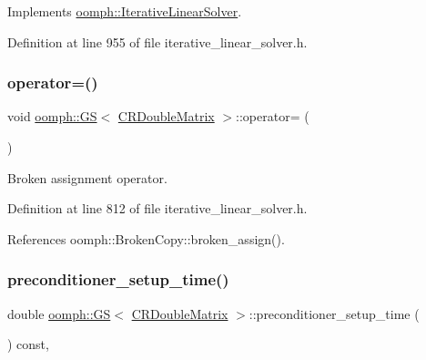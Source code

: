 Implements \hyperlink{classoomph_1_1IterativeLinearSolver_a5fe7f7b5e4847fdbd4f95d3875ec7a46}{oomph\+::\+Iterative\+Linear\+Solver}.



Definition at line 955 of file iterative\+\_\+linear\+\_\+solver.\+h.

\mbox{\label{classoomph_1_1GS_3_01CRDoubleMatrix_01_4_aa26bdc7f0230aeb37d17f4fd99dbf5c9}} 
\subsubsection{\texorpdfstring{operator=()}{operator=()}}
{\footnotesize\ttfamily void \hyperlink{classoomph_1_1GS}{oomph\+::\+GS}$<$ \hyperlink{classoomph_1_1CRDoubleMatrix}{C\+R\+Double\+Matrix} $>$\+::operator= (\begin{DoxyParamCaption}\item[{const \hyperlink{classoomph_1_1GS}{GS}$<$ \hyperlink{classoomph_1_1CRDoubleMatrix}{C\+R\+Double\+Matrix} $>$ \&}]{ }\end{DoxyParamCaption})\hspace{0.3cm}{\ttfamily [inline]}}



Broken assignment operator. 



Definition at line 812 of file iterative\+\_\+linear\+\_\+solver.\+h.



References oomph\+::\+Broken\+Copy\+::broken\+\_\+assign().

\mbox{\label{classoomph_1_1GS_3_01CRDoubleMatrix_01_4_af3ddbbec56c0ecc849b07bcec0c19bf4}} 
\subsubsection{\texorpdfstring{preconditioner\+\_\+setup\+\_\+time()}{preconditioner\_setup\_time()}}
{\footnotesize\ttfamily double \hyperlink{classoomph_1_1GS}{oomph\+::\+GS}$<$ \hyperlink{classoomph_1_1CRDoubleMatrix}{C\+R\+Double\+Matrix} $>$\+::preconditioner\+\_\+setup\+\_\+time (\begin{DoxyParamCaption}{ }\end{DoxyParamCaption}) const\hspace{0.3cm}{\ttfamily [inline]}, {\ttfamily [virtual]}}



